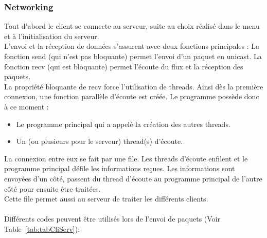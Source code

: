 \documentclass[11pt]{article}
\begin{document}
            \subsubsection{Networking}
            Tout d’abord le client se connecte au serveur, suite au choix réalisé dans le menu et à l’initialisation du serveur. \\
            L’envoi et la réception de données s’assurent avec deux fonctions principales :
            La fonction send (qui n’est pas bloquante) permet l’envoi d’un paquet en unicast.
            La fonction recv (qui est bloquante) permet l’écoute du flux et la réception des paquets.
            \\
            La propriété bloquante de recv force l’utilisation de threads.
            Ainsi dès la première connexion, une fonction parallèle d’écoute est créée.
            Le programme possède donc à ce moment :
            \begin{itemize}
                \item Le programme principal qui a appelé la création des autres threads.
                \item Un (ou plusieurs pour le serveur) thread(s) d’écoute. 
            \end{itemize}
            La connexion entre eux se fait par une file. Les threads d’écoute enfilent et le programme principal défile les informations reçues. 
            Les informations sont envoyées d'un côté, passent du thread d’écoute au programme principal de l'autre côté pour ensuite être traitées. \\
            Cette file permet aussi au serveur de traiter les différents clients.\\\\
            Différents codes peuvent être utilisés lors de l’envoi de paquets (Voir Table~\ref{tab:tabCliServ}): 
    
\end{document}
